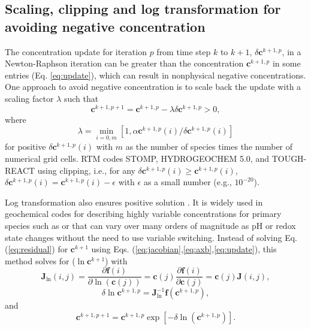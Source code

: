 \documentclass[gmd, manuscript]{copernicus}
\begin{document}
\subsection{Scaling, clipping and log transformation for avoiding negative concentration}
The concentration update for iteration $p$ from time step $k$ to $k+1$, $\delta \mathbf{c}^{k+1,p}$, in a Newton-Raphson iteration can be greater than the concentration $\mathbf{c}^{k+1,p}$ in some entries (Eq. \ref{eq:update}), which can result in nonphysical negative concentrations. One approach to avoid negative concentration is to scale back the update with a scaling factor
$\lambda$ \citep{Bethke2007,Hammond2003} such that 
\begin{equation}
\mathbf{c}^{k+1,p+1}=\mathbf{c}^{k+1,p}-\lambda \delta \mathbf{c}^{k+1,p} > 0,
\label{eq:lambda}
\end{equation}
where
\begin{equation}
\lambda = \min_{i=0,m}\left[1, \alpha {\mathbf{c}^{k+1,p}(i)}/{\delta \mathbf{c}^{k+1,p} (i)}\right]
\label{eq:alpha}
\end{equation}
for positive $\delta \mathbf{c}^{k+1,p} (i)$ with $m$ as the
number of species times the number of numerical grid cells. 
RTM codes STOMP, HYDROGEOCHEM 5.0, and TOUGH-REACT using clipping, i.e., for any $\delta \mathbf{c}^{k+1,p}(i) \geq \mathbf{c}^{k+1,p}(i)$, $\delta \mathbf{c}^{k+1,p}(i) = \mathbf{c}^{k+1,p}(i) - \epsilon$  with $\epsilon$ as a small number (e.g., $10^{-20}$). 

Log transformation also ensures positive solution \citep{Bethke2007,Hammond2003,Parkhurst1999}. It is widely used in geochemical codes for describing highly variable concentrations for primary species such as  or  that can vary over many orders of magnitude as pH or redox state changes without the need to use variable switching. Instead of solving Eq.
(\ref{eq:residual}) for $\mathbf{c}^{k+1}$ using Eqs. (\ref{eq:jacobian},\ref{eq:axb},\ref{eq:update}), this method solves for ($\ln\mathbf{c}^{k+1}$) \citep{Hammond2003} with 
\begin{equation}
\mathbf{J}_{\ln}(i,j)=\frac{\partial \mathbf{f}(i)}{\partial
\ln(\mathbf{c}(j))} = \mathbf{c}(j) \frac{\partial
\mathbf{f}(i)}{\partial \mathbf{c}(j)} = \mathbf{c}(j) \mathbf{J}(i,j),
\label{eq:jacobianlt}
\end{equation}
\begin{equation}
\delta \ln\mathbf{c}^{k+1,p}= \mathbf{J}^{-1}_{\ln} \mathbf{f} (\mathbf{c}^{k+1,p}),
\label{eq:axblt}
\end{equation}
and
\begin{equation}
\mathbf{c}^{k+1,p+1}=\mathbf{c}^{k+1,p}\exp[-\delta
\ln(\mathbf{c}^{k+1,p})].
\label{eq:updatelt}	
\end{equation}
\end{document}
